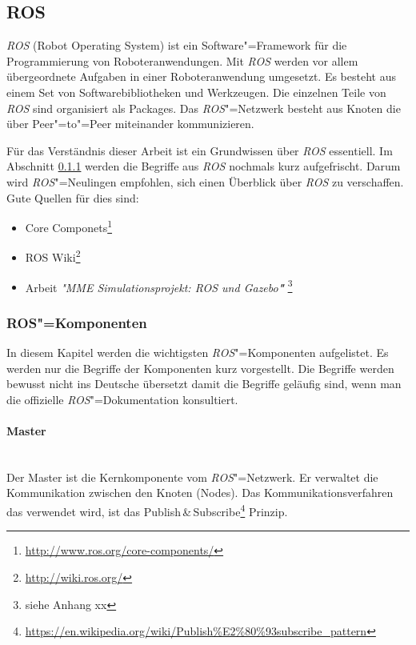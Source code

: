 \subsection{ROS}
\textit{ROS} (Robot Operating System) ist ein Software"=Framework für die Programmierung von Roboteranwendungen.
Mit \textit{ROS} werden vor allem übergeordnete Aufgaben in einer Roboteranwendung umgesetzt.
Es besteht aus einem Set von Softwarebibliotheken und Werkzeugen.
Die einzelnen Teile von \textit{ROS} sind organisiert als Packages.
Das \textit{ROS}"=Netzwerk besteht aus Knoten die über Peer"=to"=Peer miteinander kommunizieren.

Für das Verständnis dieser Arbeit ist ein Grundwissen über \textit{ROS} essentiell.
Im Abschnitt \ref{chap:ros-komponenten} werden die Begriffe aus \textit{ROS} nochmals kurz aufgefrischt.
Darum wird \textit{ROS}"=Neulingen empfohlen, sich einen Überblick über \textit{ROS} zu verschaffen.
Gute Quellen für dies sind:
\begin{itemize}
\item Core Componets\footnote{\url{http://www.ros.org/core-components/}} 
\item ROS Wiki\footnote{\url{http://wiki.ros.org/}}
\item Arbeit \textit{\textsc{"}MME Simulationsprojekt: ROS und Gazebo\textbf{"}} \footnote{siehe Anhang xx} %
\end{itemize}

\subsubsection{ROS"=Komponenten}
\label{chap:ros-komponenten}
In diesem Kapitel werden die wichtigsten \textit{ROS}"=Komponenten aufgelistet.
Es werden nur die Begriffe der Komponenten kurz vorgestellt.
Die Begriffe werden bewusst nicht ins Deutsche übersetzt damit die Begriffe geläufig sind, wenn man die offizielle \textit{ROS}"=Dokumentation konsultiert.

\paragraph*{Master} \mbox{}\\
Der Master ist die Kernkomponente vom \textit{ROS}"=Netzwerk.
Er verwaltet die Kommunikation zwischen den Knoten (Nodes).
Das Kommunikationsverfahren das verwendet wird, ist das Publish\,\&\,Subscribe\footnote{\url{https://en.wikipedia.org/wiki/Publish\%E2\%80\%93subscribe_pattern}}  Prinzip. 

